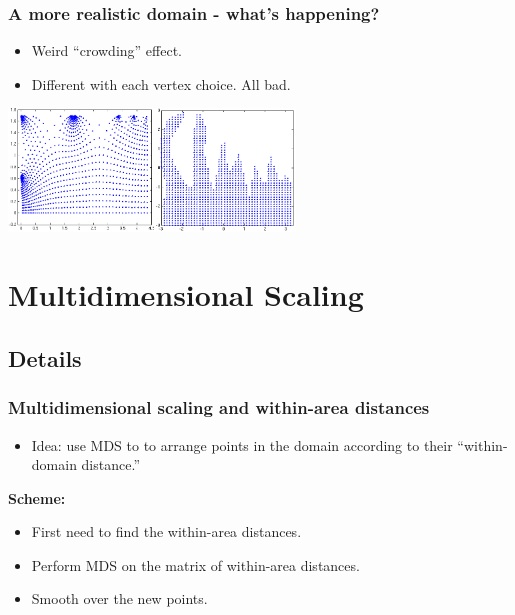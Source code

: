 \documentclass[ignorenonframetext]{beamer} %
\newcommand{\bc}{\begin{center}}
\newcommand{\ec}{\end{center}}
\newcommand{\bi}{\begin{itemize}}
\newcommand{\ei}{\end{itemize}}
\begin{document}
\begin{frame}
	\frametitle{A more realistic domain - what's happening?}
	\bi
	\item Weird ``crowding'' effect.
	\item Different with each vertex choice. All bad.
	\ei

            \bc
              \includegraphics[width=3in]{figs/wt2-crowding.png}\\
            \ec
\end{frame}

\section{Multidimensional Scaling}

\subsection{Details}

\begin{frame}
	\frametitle{Multidimensional scaling and within-area distances}
       \bi
         \item Idea: use MDS to to arrange points in the domain according to their ``within-domain distance.''
         \ei
         \bc \textbf{Scheme:} \ec
         \bi
         \item First need to find the within-area distances.
         \item Perform MDS on the matrix of within-area distances.
         \item Smooth over the new points.

        \ei
\end{frame}
\end{document}
